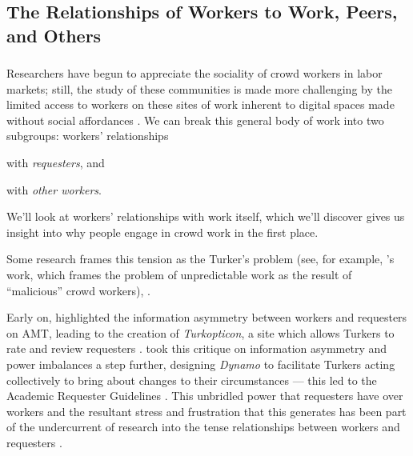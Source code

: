 \documentclass[trackingWork]{subfiles}
\begin{document}
\subsection[What will work and the place of work look like for workers]{The Relationships of Workers to Work, Peers, and Others}
\label{sec:relationships}

\subsubsection{\crowdworkpers}
Researchers have begun to appreciate
the sociality of crowd workers in labor markets;
still, the study of these communities is made more challenging by
the limited access to workers on these sites of work
inherent to digital spaces made without social affordances
\cite{crowdcollab,miller2011understanding}.
We can break this general body of work into two subgroups:
workers' relationships
\begin{inlinelist}
\item with \textit{requesters}, and
\item with \textit{other workers}.
\end{inlinelist}
We'll look at workers' relationships with work itself, which we'll discover
gives us insight into why people engage in crowd work in the first place.

Some research frames this tension as the Turker's problem
(see, for example, \citeauthor{MaliciousCrowdworkersGadiraju}'s work,
which frames the problem of unpredictable work as the result of ``malicious'' crowd workers),
\cite{MaliciousCrowdworkersGadiraju,Sheng:2008:GLI:1401890.1401965,Ipeirotis:2010:QMA:1837885.1837906}.

Early on, \citeauthor{turkopticon} highlighted
the information asymmetry between workers and requesters on AMT,
leading to the creation of \textit{Turkopticon}, a site which allows
Turkers to rate and review requesters
\cite{turkopticon}.
\citeauthor{dynamo} took this critique on information asymmetry and power imbalances a step further,
designing \textit{Dynamo} to facilitate
Turkers acting collectively to bring about changes to their circumstances
--- this led to the Academic Requester Guidelines
\cite{dynamo}.
This unbridled power that requesters have over workers and
the resultant stress and frustration that this generates
has been part of the undercurrent of research into
the tense relationships between workers and requesters
\cite{fixingChaos,dynamo}.
\end{document}
